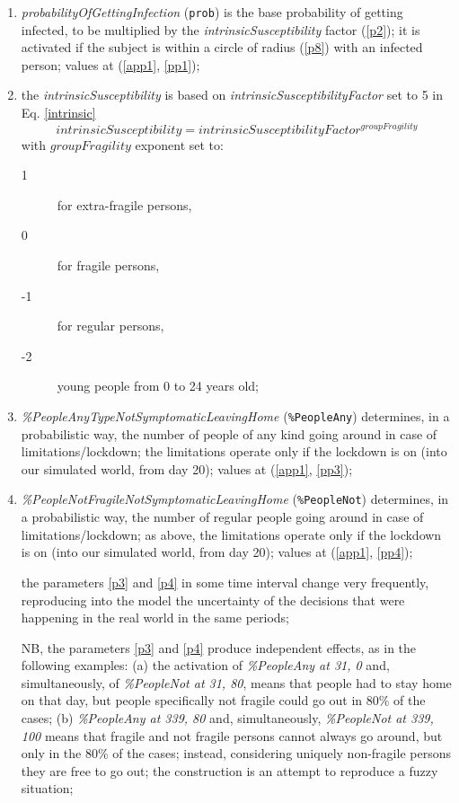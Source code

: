 \documentclass[graybox]{svmult}
\begin{document}
\begin{enumerate}[label=\roman*]

\item \label{p1} \emph{probabilityOfGettingInfection} (\verb|prob|) is the base probability of getting infected, to be multiplied by the \emph{intrinsicSusceptibility} factor (\ref{p2}); it is activated if the subject is within a circle of radius  (\ref{p8}) with an infected person; values at (\ref{app1}, \ref{pp1});

\item \label{p2} the \emph{intrinsicSusceptibility} is based on \emph{intrinsicSusceptibilityFactor} set to 5 in Eq. \ref{intrinsic}
\begin{equation}
intrinsicSusceptibility = intrinsicSusceptibilityFactor^{groupFragility}
\label{intrinsic}
\end{equation}
with $groupFragility$ exponent set to:

\begin{description}
\item [1] for extra-fragile persons,
\item [0] for fragile persons,
\item [-1] for regular persons,
\item [-2] young people from 0 to 24 years old;
\end{description}

\item \label{p3} \emph{\%PeopleAnyTypeNotSymptomaticLeavingHome} (\verb|%PeopleAny|)
determines, in a probabilistic way, the number of people of any kind going around in case of limitations/lockdown; the limitations operate only if the lockdown is on (into our simulated world, from day 20); values at (\ref{app1}, \ref{pp3}); 

\item \label{p4} \emph{\%PeopleNotFragileNotSymptomaticLeavingHome} (\verb|%PeopleNot|)
determines, in a probabilistic way, the number of regular people going around in case of limitations/lockdown;
as above, the limitations operate only if the lockdown is on (into our simulated world, from day 20); values at (\ref{app1}, \ref{pp4});

the parameters \ref{p3} and \ref{p4} in some time interval change very frequently, reproducing into the model the uncertainty of the decisions that were happening  in the real world in the same periods; 

NB, the parameters \ref{p3} and \ref{p4} produce independent effects, as in the following examples: (a) the activation of \emph{\%PeopleAny at 31, 0} and, simultaneously, of \emph{\%PeopleNot at 31, 80}, means that people had to stay home on that day, but people specifically not fragile could go out in 80\% of the cases; (b) \emph{\%PeopleAny at 339, 80} and, simultaneously, \emph{\%PeopleNot at 339, 100} means that fragile and not fragile persons cannot always go around, but only in the 80\% of the cases; instead, considering uniquely non-fragile persons they are free to go out; the construction is an attempt to reproduce a fuzzy situation;


\end{enumerate}
\end{document}
